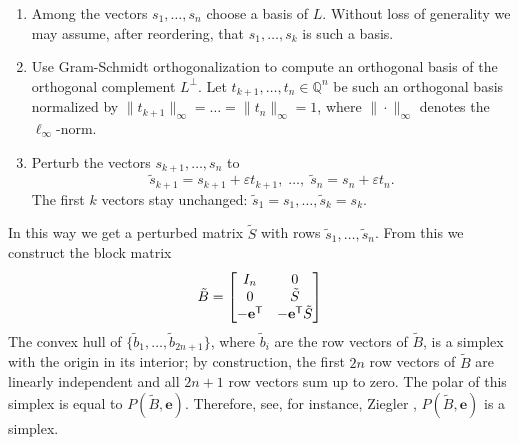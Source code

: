 \documentclass{amsart}
\newcommand{\Q}{\mathbb{Q}}
\begin{document}
\begin{enumerate}
\item Among the vectors $s_1, \ldots, s_n$ choose a basis of
  $L$. Without loss of generality we may assume, after reordering,
  that $s_1, \ldots, s_k$ is such a basis.
\item Use Gram-Schmidt orthogonalization to compute an orthogonal
  basis of the orthogonal complement $L^{\perp}$.  Let
  $t_{k+1}, \ldots, t_n \in \Q^n$ be such an orthogonal basis
  normalized by $\|t_{k+1}\|_{\infty} = \ldots = \|t_{n}\|_{\infty} = 1$, where
  $\|\cdot\|_{\infty}$ denotes the $\ell_\infty$-norm.
\item Perturb the vectors $s_{k+1}, \ldots, s_n$ to
\[
  \tilde{s}_{k+1} =  s_{k+1}+\varepsilon
  t_{k+1}, \; \ldots, \; \tilde{s}_{n}= s_{n}+\varepsilon t_{n}.
\]
The first $k$ vectors stay unchanged: $\tilde{s}_1 = s_1, \ldots,
\tilde{s}_k = s_k$.
\end{enumerate}

In this way we get a perturbed matrix $\tilde{S}$ with rows
$\tilde{s}_1, \ldots, \tilde{s}_n$. From this we construct the block matrix
\[
  \tilde{B} =
  \begin{bmatrix}
I_n & 0\\
0 & \tilde{S}\\
-\mathbf{e}^{\sf T} & -\mathbf{e}^{\sf T} \tilde{S}
  \end{bmatrix}
\]
The convex hull of $\{\tilde{b}_1,\ldots, \tilde{b}_{2n+1}\}$, 
where $\tilde{b}_i$ are the row vectors of $\tilde{B}$, is a simplex with the origin in its interior;
by construction, the first $2n$ row vectors of $\tilde{B}$ are
linearly independent and all $2n+1$ row vectors sum up to zero. 
The polar of this simplex is equal to $P(\tilde{B},\textbf{e})$. 
Therefore, see, for instance, Ziegler \cite[Chapter 2.3]{Ziegler-1995}, $P(\tilde{B},\textbf{e})$
is a simplex.

\smallskip
\end{document}
